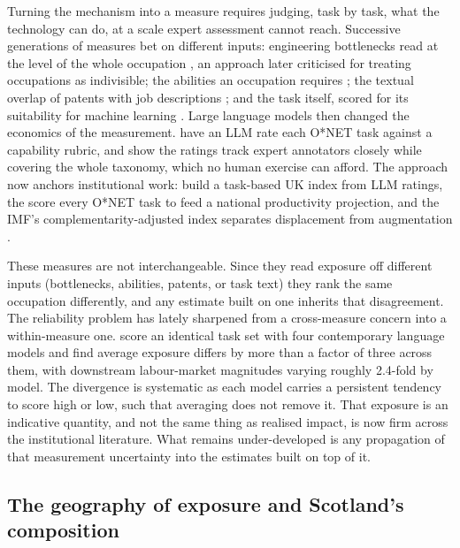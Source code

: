 Turning the mechanism into a measure requires judging, task by task, what the technology can do, at a scale expert assessment cannot reach. Successive generations of measures bet on different inputs: engineering bottlenecks read at the level of the whole occupation \citep{frey2017}, an approach later criticised for treating occupations as indivisible; the abilities an occupation requires \citep{felten2021}; the textual overlap of patents with job descriptions \citep{webb2019}; and the task itself, scored for its suitability for machine learning \citep{brynjolfsson2018}. Large language models then changed the economics of the measurement. \citet{eloundou2024} have an LLM rate each O*NET task against a capability rubric, and show the ratings track expert annotators closely while covering the whole taxonomy, which no human exercise can afford. The approach now anchors institutional work: \citet{henseke2025} build a task-based UK index from LLM ratings, the \citet{obr2025} score every O*NET task to feed a national productivity projection, and the IMF's complementarity-adjusted index separates displacement from augmentation \citep{pizzinelli2023, cazzaniga2024}.

These measures are not interchangeable. Since they read exposure off different inputs (bottlenecks, abilities, patents, or task text) they rank the same occupation differently, and any estimate built on one inherits that disagreement. The reliability problem has lately sharpened from a cross-measure concern into a within-measure one. \citet{yin2026} score an identical task set with four contemporary language models and find average exposure differs by more than a factor of three across them, with downstream labour-market magnitudes varying roughly 2.4-fold by model. The divergence is systematic as each model carries a persistent tendency to score high or low, such that averaging does not remove it. That exposure is an indicative quantity, and not the same thing as realised impact, is now firm across the institutional literature. What remains under-developed is any propagation of that measurement uncertainty into the estimates built on top of it.

\subsection*{The geography of exposure and Scotland's composition}

